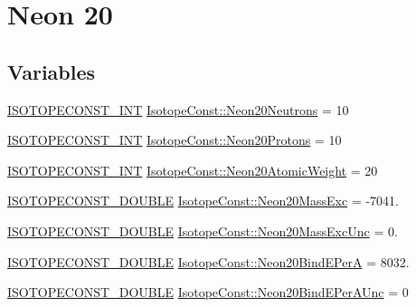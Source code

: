 \hypertarget{group___isotope_const-_neon-_ne20}{}\section{Neon 20}
\label{group___isotope_const-_neon-_ne20}
\subsection*{Variables}
\begin{DoxyCompactItemize}
\item 
\mbox{\hyperlink{group___isotope_const-_macros_ga5f18360b3e99483a35c32d789e62621c}{I\+S\+O\+T\+O\+P\+E\+C\+O\+N\+S\+T\+\_\+\+I\+NT}} \mbox{\hyperlink{group___isotope_const-_neon-_ne20_ga61e7a6967aa0ece391f0462d0d5a9caa}{Isotope\+Const\+::\+Neon20\+Neutrons}} = 10
\item 
\mbox{\hyperlink{group___isotope_const-_macros_ga5f18360b3e99483a35c32d789e62621c}{I\+S\+O\+T\+O\+P\+E\+C\+O\+N\+S\+T\+\_\+\+I\+NT}} \mbox{\hyperlink{group___isotope_const-_neon-_ne20_ga158706cad3867afccea21970c311e37b}{Isotope\+Const\+::\+Neon20\+Protons}} = 10
\item 
\mbox{\hyperlink{group___isotope_const-_macros_ga5f18360b3e99483a35c32d789e62621c}{I\+S\+O\+T\+O\+P\+E\+C\+O\+N\+S\+T\+\_\+\+I\+NT}} \mbox{\hyperlink{group___isotope_const-_neon-_ne20_gae14aeac962e84a98a6d802108538d356}{Isotope\+Const\+::\+Neon20\+Atomic\+Weight}} = 20
\item 
\mbox{\hyperlink{group___isotope_const-_macros_ga8f45a7272ce02c0b4c65c44636ed719a}{I\+S\+O\+T\+O\+P\+E\+C\+O\+N\+S\+T\+\_\+\+D\+O\+U\+B\+LE}} \mbox{\hyperlink{group___isotope_const-_neon-_ne20_ga86c24f5cc79ad6dba08fd0f60e7783d0}{Isotope\+Const\+::\+Neon20\+Mass\+Exc}} = -\/7041.
\item 
\mbox{\hyperlink{group___isotope_const-_macros_ga8f45a7272ce02c0b4c65c44636ed719a}{I\+S\+O\+T\+O\+P\+E\+C\+O\+N\+S\+T\+\_\+\+D\+O\+U\+B\+LE}} \mbox{\hyperlink{group___isotope_const-_neon-_ne20_ga83af706f9606e3bd419668f5e54b6671}{Isotope\+Const\+::\+Neon20\+Mass\+Exc\+Unc}} = 0.
\item 
\mbox{\hyperlink{group___isotope_const-_macros_ga8f45a7272ce02c0b4c65c44636ed719a}{I\+S\+O\+T\+O\+P\+E\+C\+O\+N\+S\+T\+\_\+\+D\+O\+U\+B\+LE}} \mbox{\hyperlink{group___isotope_const-_neon-_ne20_gadc70fb3877f41b7718f09ba15ba24a4f}{Isotope\+Const\+::\+Neon20\+Bind\+E\+PerA}} = 8032.
\item 
\mbox{\hyperlink{group___isotope_const-_macros_ga8f45a7272ce02c0b4c65c44636ed719a}{I\+S\+O\+T\+O\+P\+E\+C\+O\+N\+S\+T\+\_\+\+D\+O\+U\+B\+LE}} \mbox{\hyperlink{group___isotope_const-_neon-_ne20_gac3ab1a9fd186d04b4c6d7c80f3eafc02}{Isotope\+Const\+::\+Neon20\+Bind\+E\+Per\+A\+Unc}} = 0

\end{DoxyCompactItemize}
